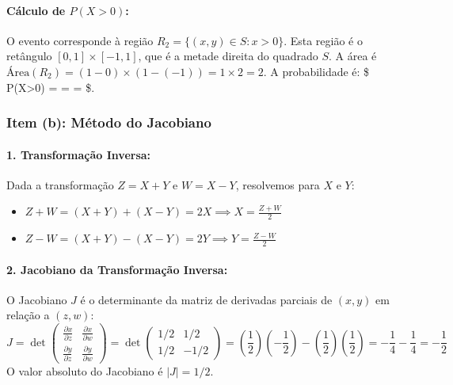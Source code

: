\documentclass[
]{article}
\begin{document}
\paragraph{Cálculo de $P(X>0)$:}

O evento corresponde à região \(R_2 = \{ (x,y) \in S : x > 0 \}\). Esta
região é o retângulo \([0,1] \times [-1,1]\), que é a metade direita do
quadrado \(S\). A área é
\(\text{Área}(R_2) = (1-0) \times (1-(-1)) = 1 \times 2 = 2\). A
probabilidade é: \$ P(X\textgreater0) =
 =  = \$.

\subsubsection*{Item (b): Método do Jacobiano}
\paragraph{1. Transformação Inversa:}

Dada a transformação \(Z=X+Y\) e \(W=X-Y\), resolvemos para \(X\) e
\(Y\):

\begin{itemize}
    \item $Z+W = (X+Y)+(X-Y) = 2X \implies X = \frac{Z+W}{2}$
    \item $Z-W = (X+Y)-(X-Y) = 2Y \implies Y = \frac{Z-W}{2}$
\end{itemize}

\paragraph{2. Jacobiano da Transformação Inversa:}

O Jacobiano \(J\) é o determinante da matriz de derivadas parciais de
\((x,y)\) em relação a \((z,w)\):
\[ J = \det \begin{pmatrix} \frac{\partial x}{\partial z} & \frac{\partial x}{\partial w} \\ \frac{\partial y}{\partial z} & \frac{\partial y}{\partial w} \end{pmatrix} = \det \begin{pmatrix} 1/2 & 1/2 \\ 1/2 & -1/2 \end{pmatrix} = \left(\frac{1}{2}\right)\left(-\frac{1}{2}\right) - \left(\frac{1}{2}\right)\left(\frac{1}{2}\right) = -\frac{1}{4} - \frac{1}{4} = -\frac{1}{2} \]
O valor absoluto do Jacobiano é \(|J| = 1/2\).
\end{document}
